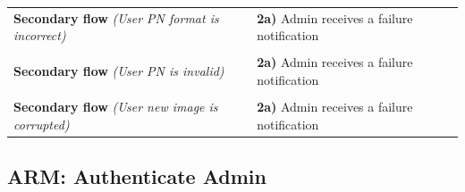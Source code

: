 \documentclass[a4paper,11pt]{article}
\begin{document}
\begin{tabular}{|p{3.5cm}|p{11.5cm}|}
    \\ \hline \rowcolor{Gray} & \\ \hline  
   
    \textbf{Secondary flow} \emph{(User PN format is incorrect)} &  
    \textbf{2a)} Admin receives a failure notification
   
    \\ \hline \rowcolor{Gray} & \\ \hline  
   
    \textbf{Secondary flow} \emph{(User PN is invalid)} &  
    \textbf{2a)} Admin receives a failure notification
   
    \\ \hline \rowcolor{Gray} & \\ \hline  
    
    \textbf{Secondary flow} \emph{(User new image is corrupted)} &  
    \textbf{2a)} Admin receives a failure notification 
    
    \\ \hline   
\end{tabular} 

\subsection{ARM: Authenticate Admin}
\end{document}
